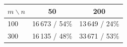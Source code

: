 \begin{tabular}{lcc}
\toprule
$m\backslash n$ & 50 & 200 \\
\midrule
100 & 16\,673 / 54\% & 13\,649 / 24\% \\
300 & 16\,135 / 48\% & 33\,671 / 53\% \\
\bottomrule
\end{tabular}